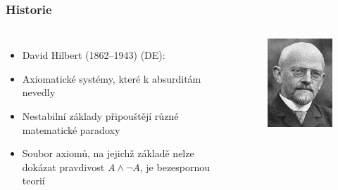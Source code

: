 \documentclass[aspectratio=169]{beamer}
\begin{document}
\begin{frame}
\frametitle{Historie}
\begin{columns}
\begin{itemize}
\item David Hilbert (1862--1943) (DE):
\item Axiomatické systémy, které k absurditám nevedly
\item Nestabilní základy připouštějí různé matematické paradoxy 
\item Soubor axiomů, na jejichž základě nelze dokázat pravdivost $A \land \neg A$, je bezespornou teorií
\end{itemize}

\begin{figure}
\includegraphics[scale=0.45]{hilbert}
\end{figure}
\end{columns}
\end{frame}
\end{document}
